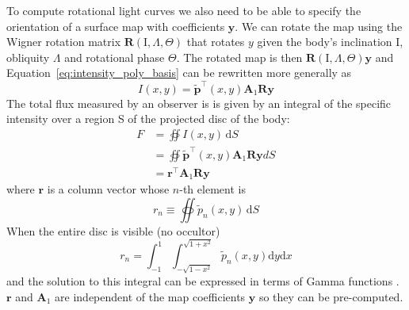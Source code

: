 \documentclass[12pt,dvipsnames]{report}
\newcommand{\ud}{\,\mathrm{d}}
\begin{document}
To compute rotational light curves we also need to be able to specify the
orientation of a surface map with coefficients $\mathbf y$. We can rotate the
map using the Wigner rotation matrix $\mathbf{R}(\mathrm{I}, \Lambda, \Theta)$
that rotates $y$ given the body's inclination $\mathrm{I}$, obliquity $\Lambda$
and rotational phase $\Theta$. The rotated map is then $\mathbf{R}(\mathrm{I},
    \Lambda, \Theta) \mathbf{y}$ and Equation~\ref{eq:intensity_poly_basis} can be
rewritten more generally as
\begin{equation}
    I(x, y)=\tilde{\mathbf{p}}^{\intercal}(x, y) \mathbf{A}_1 \mathbf{R}\mathbf{y}
\end{equation}
The total flux measured by an observer is is given by an integral of the specific
intensity over a region S of the projected disc of the body:
\begin{align}
    F & =\oiint I(x, y) \ud S                                                                 \\
      & =\oiint \tilde{\mathbf{p}}^{\intercal}(x, y) \mathbf{A}_{1} \mathbf{R} \mathbf{y} d S \\
      & =\mathbf{r}^{\intercal} \mathbf{A}_{1} \mathbf{R} \mathbf{y}
\end{align}
where $\mathbf{r}$ is a column vector whose $n$-th element is \citep{2019AJ....157...64L}
\begin{equation}
    r_{n} \equiv \oiint \tilde{p}_{n}(x, y) \ud S
\end{equation}
When the entire disc is visible (no occultor)
\begin{equation}
    r_{n}=\int_{-1}^{1} \int_{-\sqrt{1-x^{2}}}^{\sqrt{1+x^{2}}} \tilde{p}_{n}(x, y) \mathrm{d}y \mathrm{d} x
\end{equation}
and the solution to this integral can be expressed in terms of Gamma functions
\citep[Equation 20 in ][]{2019AJ....157...64L}.
$\mathbf{r}$ and $\mathbf{A}_1$ are independent of the map coefficients $\mathbf{y}$
so they can be pre-computed.
\end{document}
